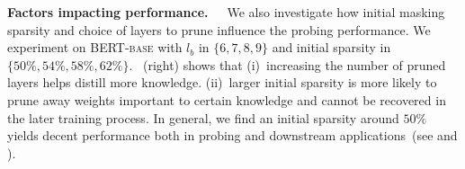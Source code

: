 \noindent
\textbf{Factors impacting performance.}~~~We also investigate how initial masking sparsity and choice of layers to prune influence the probing performance. We experiment on \textsc{BERT-base} with $l_b$ in $\{6,7,8,9\}$ and initial sparsity in $\{50\%,54\%,58\%,62\%\}$. ~(right) shows that (i)~increasing the number of pruned layers helps distill more knowledge. (ii)~larger initial sparsity is more likely to prune away weights important to certain knowledge and cannot be recovered in the later training process. In general, we find an initial sparsity around $50\%$ yields decent performance both in probing and downstream applications~(see  and ).




